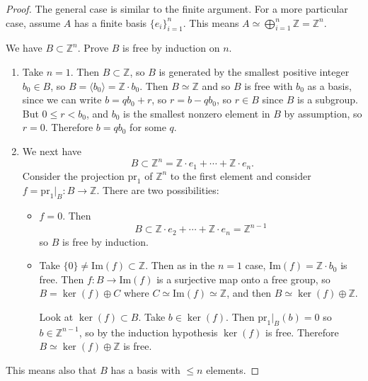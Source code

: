 \begin{proof}
The general case is similar to the finite argument.
For a more particular case, assume $A$ has a finite basis
$\{e_i\}_{i = 1}^n$.
This means $A \simeq \bigoplus_{i = 1}^n \mathbb{Z} = \mathbb{Z}^n$.

We have $B \subset \mathbb{Z}^n$. Prove $B$ is free by induction on
$n$.

\begin{enumerate}
  \item{
    Take $n = 1$. Then $B \subset \mathbb{Z}$, so $B$ is generated
    by the smallest positive integer $b_0 \in B$, so
    $B = \langle b_0 \rangle = \mathbb{Z} \cdot b_0$. Then
    $B \simeq \mathbb{Z}$ and so $B$ is free with $b_0$ as a
    basis, since we can write $b = q b_0 + r$, so
    $r = b - q b_0$, so $r \in B$ since $B$ is a subgroup. But
    $0 \leq r < b_0$, and $b_0$ is the smallest nonzero element in
    $B$ by assumption, so $r = 0$. Therefore $b = q b_0$ for some $q$.
  }
  \item{
    We next have
    $$
    B \subset \mathbb{Z}^n = \mathbb{Z} \cdot e_1
                           + \cdots
                           + \mathbb{Z} \cdot e_n.
    $$
    Consider the projection $\mathrm{pr}_1$ of $\mathbb{Z}^n$ to the
    first element and consider
    $f = \mathrm{pr}_1|_B : B \to \mathbb{Z}$. There are two
    possibilities:
    \begin{itemize}
      \item{
        $f = 0$. Then
        $$
        B \subset \mathbb{Z} \cdot e_2 + \cdots + \mathbb{Z} \cdot e_n
          =       \mathbb{Z}^{n-1}
        $$
        so $B$ is free by induction.
      }
      \item{
        Take $\{ 0 \} \neq \mathrm{Im}(f) \subset \mathbb{Z}$. Then as
        in the $n = 1$ case, $\mathrm{Im}(f) = \mathbb{Z} \cdot b_0$
        is free. Then $f : B \to \mathrm{Im}(f)$ is a surjective map
        onto a free group, so
        $B = \ker(f) \oplus C$ where $C \simeq \mathrm{Im}(f) \simeq
        \mathbb{Z}$, and then
        $B \simeq \ker(f) \oplus \mathbb{Z}$.

        Look at $\ker(f) \subset B$. Take $b \in \ker (f)$. Then
        $\mathrm{pr}_1|_B(b) = 0$ so $b \in \mathbb{Z}^{n-1}$, so by
        the induction hypothesis $\ker(f)$ is free. Therefore
        $B \simeq \ker(f) \oplus \mathbb{Z}$ is free.
      }
    \end{itemize}
  }
\end{enumerate}
This means also that $B$ has a basis with $\leq n$ elements.
\end{proof}
